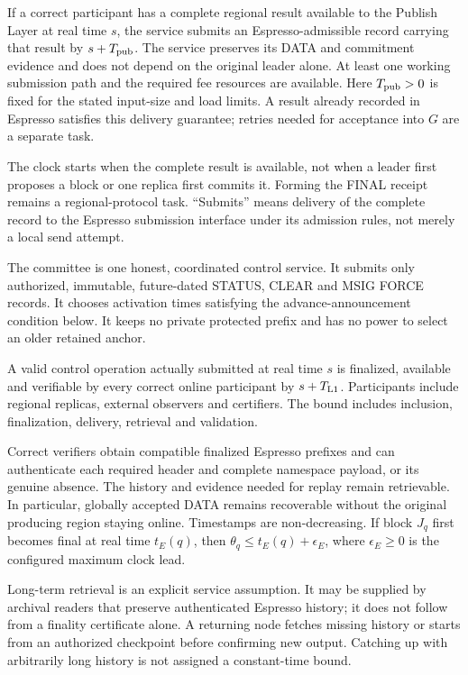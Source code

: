 \begin{assumption}
\label{ass:publish}
If a correct participant has a complete regional result available to the
Publish Layer at real time $s$, the service submits an Espresso-admissible
record carrying that result by $s+T_{\rm pub}$. The service preserves its
DATA and commitment evidence and does not depend on the original leader
alone. At least one working submission path and the required fee resources
are available. Here $T_{\rm pub}>0$ is fixed for the stated input-size and load
limits. A result already recorded in Espresso satisfies this delivery
guarantee; retries needed for acceptance into $G$ are a separate task.
\end{assumption}
The clock starts when the complete result is available, not when a leader
first proposes a block or one replica first commits it. Forming the FINAL
receipt remains a regional-protocol task. ``Submits'' means delivery of the
complete record to the Espresso submission interface under its admission
rules, not merely a local send attempt.


\begin{assumption}
\label{ass:committee}
The committee is one honest, coordinated control service. It submits
only authorized, immutable, future-dated STATUS, CLEAR and MSIG FORCE
records. It chooses activation times satisfying the advance-announcement
condition below. It keeps no private protected prefix and has no power
to select an older retained anchor.
\end{assumption}

\begin{assumption}
\label{ass:monitor}
A valid control operation actually submitted at real time $s$ is
finalized, available and verifiable by every correct online participant
by $s+T_{\rm L1}$. Participants include regional replicas, external
observers and certifiers. The bound includes inclusion, finalization,
delivery, retrieval and validation.
\end{assumption}

\begin{assumption}
\label{ass:espresso}
Correct verifiers obtain compatible finalized Espresso prefixes and
can authenticate each required header and complete namespace payload,
or its genuine absence. The history and evidence needed for replay remain
retrievable. In particular, globally accepted DATA remains recoverable
without the original producing region staying online. Timestamps are
non-decreasing. If block $J_q$ first becomes final at real time $t_E(q)$,
then $\theta_q\le t_E(q)+\epsilon_E$, where $\epsilon_E\ge0$ is the
configured maximum clock lead.
\end{assumption}
Long-term retrieval is an explicit service assumption. It may be supplied
by archival readers that preserve authenticated Espresso history; it does
not follow from a finality certificate alone. A returning node fetches
missing history or starts from an authorized checkpoint before confirming
new output. Catching up with arbitrarily long history is not assigned a
constant-time bound.

